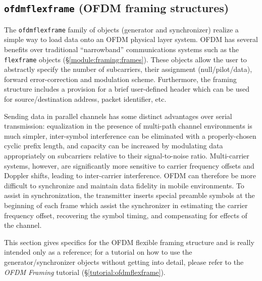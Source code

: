 % 
%
\subsection{{\tt ofdmflexframe} (OFDM framing structures)}
\label{module:framing:ofdmflexframe}

The {\tt ofdmflexframe} family of objects (generator and synchronizer)
realize a simple way to load data onto an OFDM physical layer
system. OFDM has several benefits over traditional ``narrowband''
communications systems such as the {\tt flexframe} objects
(\S\ref{module:framing:frames}).
These objects allow the user to abstractly specify the number of
subcarriers, their assignment (null/pilot/data), forward
error-correction and modulation scheme.
Furthermore, the framing structure includes a provision for a brief
user-defined header which can be used for source/destination
address, packet identifier, etc.

Sending data in parallel channels has some distinct advantages over
serial transmission:
equalization in the presence of multi-path channel environments is much
simpler,
inter-symbol interference can be eliminated with a properly-chosen
cyclic prefix length,
and capacity can be increased by modulating data appropriately on
subcarriers relative to their signal-to-noise ratio.
Multi-carrier systems, however, are significantly more sensitive to
carrier frequency offsets and Doppler shifts, leading to inter-carrier
interference.
OFDM can therefore be more difficult to synchronize and maintain data
fidelity in mobile environments.
To assist in synchronization, the transmitter inserts special preamble
symbols at the beginning of each frame which assist the synchronizer in
estimating the carrier frequency offset,
recovering the symbol timing, and
compensating for effects of the channel.

This section gives specifics for the OFDM flexible framing structure and
is really intended only as a reference;
for a tutorial on how to use the generator/synchronizer objects without
getting into detail, please refer to the {\em OFDM Framing} tutorial
(\S\ref{tutorial:ofdmflexframe}).

